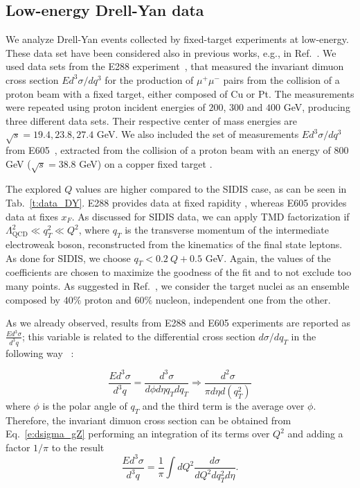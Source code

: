 \documentclass[aps,preprintnumbers,showpacs,nofootinbib,superscriptaddress,floatfix]{revtex4}
\begin{document}
\subsection{Low-energy Drell-Yan data}
\label{ss:dy}

We analyze Drell-Yan events collected by fixed-target experiments at
low-energy. These data set have been considered also in previous works, e.g.,
in Ref.~\cite{Landry:1999an,Landry:2002ix,Konychev:2005iy,DAlesio:2014mrz}. 
We used data sets from the E288 experiment~\cite{Ito:1980ev}, that measured the invariant dimuon cross section $E d^3\sigma / dq^3$ for the production of $\mu^+ \mu^-$ pairs from the collision of a proton beam with a fixed target, either composed of Cu or Pt.
The measurements were repeated using proton incident energies of $200$, $300$ and $400$ GeV, producing three different data sets.
Their respective center of mass energies are $\sqrt{s}=19.4,23.8,27.4$ GeV.
We also included the set of measurements $E d^3\sigma / dq^3$ from E605~\cite{Moreno:1990sf}, extracted from the collision of a proton beam with an energy of $800$ GeV ($\sqrt{s}=38.8$ GeV) on a copper fixed target .

The explored $Q$ values are higher compared to the SIDIS case, as can be seen
in Tab.~\ref{t:data_DY}. E288 provides data at fixed rapidity
,
whereas E605 provides data at fixes $x_F$.  
As discussed for SIDIS data, we can apply TMD factorization if
$\Lambda_{\text{QCD}}^2 \ll q_T^2 \ll Q^2$, where $q_T$ is the transverse
momentum of the intermediate electroweak boson, reconstructed from the
kinematics of the final state leptons. As done for SIDIS, we choose $q_T <
0.2\ Q + 0.5$ GeV. Again, the values of the coefficients are chosen to
maximize the goodness of the fit and to not exclude too many points. 
As suggested in Ref.~\cite{Ito:1980ev}, we consider the target nuclei as an ensemble composed by $40\%$ proton and $60\%$ nucleon, independent one from the other.

As we already observed, results from E288 and E605 experiments are reported as
$\frac{Ed^3\sigma}{d^3q}$; this variable is related to the differential cross section $d\sigma/dq_T$ in the following way~\cite{Olive:2016xmw} :

\begin{equation}
\frac{Ed^3\sigma}{d^3q}=\frac{d^3\sigma}{d\phi d\eta q_T dq_T} \Rightarrow \frac{d^2\sigma}{\pi d\eta d(q^2_T)}
\end{equation}
where $\phi$ is the polar angle of $q_T$ and 
the third term is the average over $\phi$.
Therefore, the invariant dimuon cross section can be obtained from Eq.~\ref{e:dsigma_gZ} performing an integration of its terms over $Q^2$ and adding a factor $1/\pi$ to the result
\begin{equation}
\frac{Ed^3\sigma}{d^3q} = \frac{1}{\pi} \int dQ^2 \frac{d\sigma}{dQ^2dq^2_T d\eta} .
\end{equation}
\end{document}
